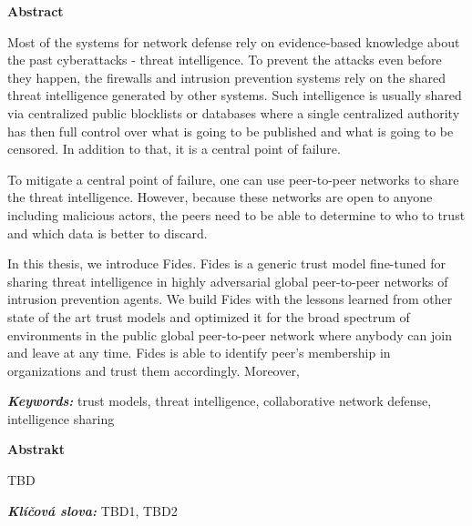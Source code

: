 \newenvironment{abstractpage}
  {\cleardoublepage\thispagestyle{empty}}
  {\vfill\cleardoublepage}
\newenvironment{abstract}[1]
  {\bigskip
   \begin{center}\bfseries#1\end{center}\small\leftskip=0.5cm\rightskip=0.5cm}
  {\par\bigskip}

\providecommand{\keywords}[2]{\footnotesize\textbf{\textit{#1:}} #2}

\begin{abstractpage}
\begin{abstract}{Abstract}

Most of the systems for network defense rely on evidence-based knowledge about the past cyberattacks - threat intelligence. To prevent the attacks even before they happen, the firewalls and intrusion prevention systems rely on the shared threat intelligence generated by other systems.
Such intelligence is usually shared via centralized public blocklists or databases where a single centralized authority has then full control over what is going to be published and what is going to be censored. In addition to that, it is a central point of failure.

To mitigate a central point of failure, one can use peer-to-peer networks to share the threat intelligence. However, because these networks are open to anyone including malicious actors, the peers need to be able to determine to who to trust and which data is better to discard.

In this thesis, we introduce Fides. Fides is a generic trust model fine-tuned for sharing threat intelligence in highly adversarial global peer-to-peer networks of intrusion prevention agents.
We build Fides with the lessons learned from other state of the art trust models and optimized it for the broad spectrum of environments in the public global peer-to-peer network where anybody can join and leave at any time.
Fides is able to identify peer's membership in organizations and trust them accordingly.
Moreover, 


\end{abstract}

\keywords{Keywords}{trust models, threat intelligence, collaborative network defense, intelligence sharing}

\vspace*{\fill}

\newpage
\begin{abstract}{Abstrakt}
    TBD 
    
\end{abstract}
\keywords{Klíčová slova}{TBD1, TBD2} 

\end{abstractpage}
\thispagestyle{empty}

\cleardoublepage